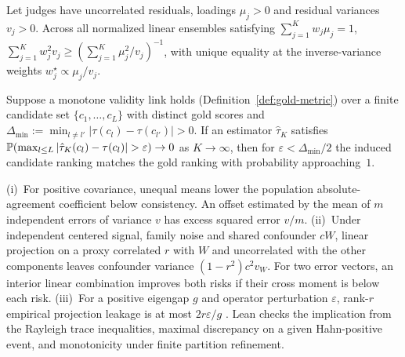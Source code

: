 \begin{theorem}
\label{thm:optimal-weights}
Let judges have uncorrelated residuals, loadings $\mu_j > 0$ and residual variances
$v_j > 0$. Across all normalized linear ensembles satisfying $\sum_{j=1}^K w_j \mu_j = 1$,
$\sum_{j=1}^K w_j^2 v_j \ge (\sum_{j=1}^K \mu_j^2 / v_j)^{-1}$, with unique
equality at the inverse-variance weights $w_j^\star \propto \mu_j / v_j$.
\end{theorem}

\begin{theorem}
\label{thm:gold-consistency}
Suppose a monotone validity link holds (Definition~\ref{def:gold-metric}) over a
finite candidate set $\{c_1, \ldots, c_L\}$ with distinct gold scores and
$\Delta_{\min} := \min_{l \neq l'} |\tau(c_l) - \tau(c_{l'})| > 0$. If an
estimator $\hat\tau_K$ satisfies $\mathbb{P}(\max_{l \le L} |\hat\tau_K(c_l) -
\tau(c_l)| > \varepsilon) \to 0$ as $K \to \infty$, then for $\varepsilon <
\Delta_{\min}/2$ the induced candidate ranking matches the gold ranking with
probability approaching~$1$.
\end{theorem}

\begin{theorem}
\label{thm:calibration-dk}
(i)~For positive covariance, unequal means lower the population absolute-agreement coefficient below consistency.
An offset estimated by the mean of $m$ independent errors of variance $v$ has excess squared error $v/m$.
(ii)~Under independent centered signal, family noise and shared confounder $cW$, linear projection on a proxy correlated $r$ with $W$ and uncorrelated with the other components leaves confounder variance $(1-r^2)c^2 v_W$.
For two error vectors, an interior linear combination improves both risks if their cross moment is below each risk.
(iii)~For a positive eigengap $g$ and operator perturbation $\varepsilon$, rank-$r$ empirical projection leakage is at most $2r\varepsilon/g$ \citep{davis1970rotation}.
Lean checks the implication from the Rayleigh trace inequalities, maximal discrepancy on a given Hahn-positive event, and monotonicity under finite partition refinement.
\end{theorem}
